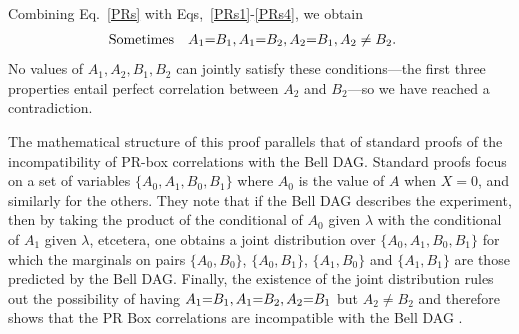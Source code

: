 Combining Eq.~\eqref{PRs} with Eqs,~\eqref{PRs1}-\eqref{PRs4}, we obtain
\begin{align}
\text{Sometimes} \quad &A_1\mathord{=} B_1, A_1\mathord{=} B_2, A_2\mathord{=} B_1, A_2\ne B_2.
\end{align} 
No values of $A_1, A_2, B_1, B_2$ can jointly satisfy these conditions---the first three properties entail perfect correlation between $A_2$ and $B_2$---so we have reached a contradiction.


The mathematical structure of this proof parallels that of standard proofs of the incompatibility of PR-box correlations with the Bell DAG.  Standard proofs focus on a set of variables $\{A_0, A_1, B_0, B_1\}$ where $A_0$  is the value of $A$ when $X=0$, and similarly for the others. They note that if the Bell DAG describes the experiment, then by taking the product of the conditional of $A_0$ given $\lambda$ with the conditional of $A_1$ given $\lambda$, etcetera, one obtains a joint distribution over $\{A_0, A_1, B_0, B_1\}$ for which the marginals on pairs  $\{ A_0, B_0\}$, $\{ A_0, B_1\}$, $\{ A_1, B_0\}$ and $\{ A_1, B_1\}$ are those predicted by the Bell DAG.  Finally, the existence of the joint distribution rules out the possibility of having $A_1\mathord{=} B_1, A_1\mathord{=} B_2, A_2\mathord{=} B_1$ but $ A_2\ne B_2$ and therefore shows that the PR Box correlations are incompatible with the Bell DAG \cite{LSW,roberts_thesis}.



